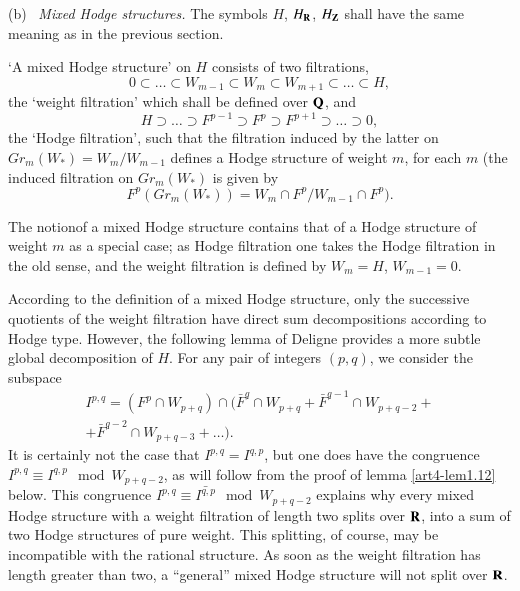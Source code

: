 \medskip
\noindent
(b)~ \textit{Mixed Hodge structures.} The symbols $H$, $H_{\mathbf{R}}$, $H_{\mathbf{Z}}$ shall have the same meaning as in the previous section.

\begin{definition}\label{art4-def1.11}
`A mixed Hodge structure' on $H$ consists of two filtrations,
$$
0 \subset \ldots \subset W_{m-1} \subset W_m \subset W_{m+1} \subset \ldots \subset H,
$$
the `weight filtration' which shall be defined over $\mathbf{Q}$, and 
$$
H \supset \ldots \supset F^{p-1} \supset F^p \supset F^{p+1} \supset \ldots \supset 0,
$$
the `Hodge filtration', such that the filtration induced by the latter on $Gr_m(W_\ast) = W_m/W_{m-1}$ defines a Hodge structure of weight $m$, for each $m$ (the induced filtration on $Gr_m(W_\ast)$ is given by
$$
F^p (Gr_m (W_\ast)) = W_m \cap F^p/W_{m-1} \cap F^p).
$$
\end{definition}


\begin{remark*}
The notion\pageoriginale of a mixed Hodge structure contains that of a Hodge structure of weight $m$ as a special case; as Hodge filtration one takes the Hodge filtration in the old sense, and the weight filtration is defined by $W_m = H$, $W_{m-1} = 0$.
\end{remark*}

According to the definition of a mixed Hodge structure, only the successive quotients of the weight filtration have direct sum decompositions according to Hodge type. However, the following lemma of Deligne \cite{art4-key13} provides a more subtle global decomposition of $H$. For any pair of integers $(p,q)$, we consider the subspace
\begin{multline*}
I^{p,q} = (F^p \cap W_{p+q}) \cap (\bar{F}^q \cap W_{p+q} + \bar{F}^{q-1} \cap W_{p+q-2} +\\
 + \bar{F}^{q-2} \cap W_{p+q-3} + \ldots).
\end{multline*}
It is certainly not the case that $I^{p,q} = I^{q,p}$, but one does have the congruence $I^{p,q} \equiv I^{q,p} \mod W_{p+q-2}$, as will follow from the proof of lemma \ref{art4-lem1.12} below. This congruence $I^{p,q} \equiv \bar{I^{q,p}} \mod  W_{p+q-2}$ explains why every mixed Hodge structure with a weight filtration of length two splits over $\mathbf{R}$, into a sum of two Hodge structures of pure weight. This splitting, of course, may be incompatible with the rational structure. As soon as the weight filtration has length greater than two, a ``general'' mixed Hodge structure will not split over $\mathbf{R}$.


